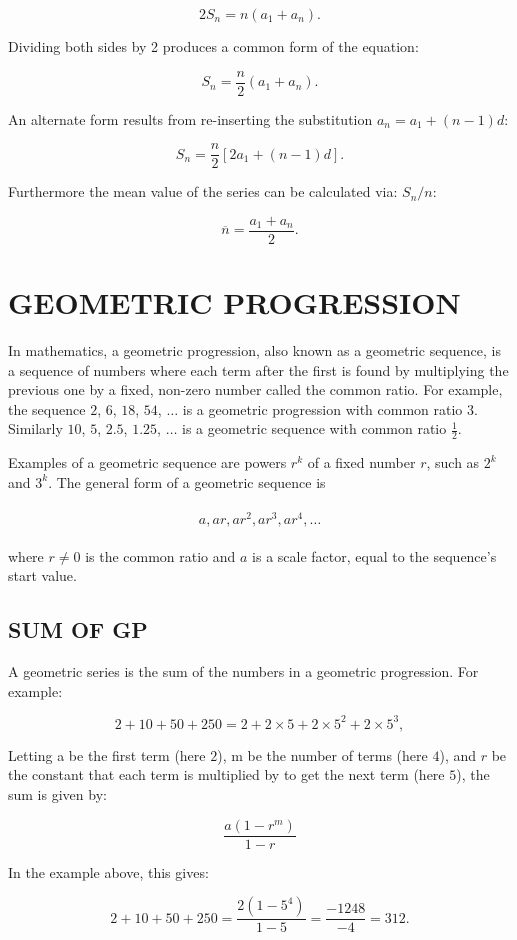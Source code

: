 \documentclass[11pt]{article}
\begin{document}
    $$2S_{n}=n(a_{1} + a_{n}).$$

Dividing both sides by 2 produces a common form of the equation:

    $$S_{n}=\frac{n}{2}( a_{1} + a_{n}).$$

An alternate form results from re-inserting the substitution $a_{n} = a_{1} + (n-1)d$:

    $$S_{n}=\frac{n}{2}[ 2a_{1} + (n-1)d].$$

Furthermore the mean value of the series can be calculated via: $S_{n} / n$:

    $$\overline{n} =\frac{a_{1} + a_{n}}{2}.$$ 
\section{GEOMETRIC PROGRESSION}
In mathematics, a geometric progression, also known as a geometric sequence, is a sequence of numbers where each term after the first is found by multiplying the previous one by a fixed, non-zero number called the common ratio. For example, the sequence $2$, $6$, $18$, $54$, $\ldots$ is a geometric progression with common ratio $3$. Similarly $10$, $5$, $2.5$, $1.25$, $\ldots$ is a geometric sequence with common ratio $\frac{1}{2}$.

Examples of a geometric sequence are powers $r^{k}$ of a fixed number $r$, such as $2^{k}$ and $3^{k}$. The general form of a geometric sequence is\\
\\
$$a,ar,ar^{2},ar^{3},ar^{4}, \ldots$$
\\
where $r \neq 0$ is the common ratio and $a$ is a scale factor, equal to the sequence's start value.
\subsection{SUM OF GP}
A geometric series is the sum of the numbers in a geometric progression. For example:

   $$2 + 10 + 50 + 250 = 2 + 2 \times 5 + 2 \times 5^{2} + 2 \times 5^{3} ,$$

Letting a be the first term (here $2$), m be the number of terms (here $4$), and $r$ be the constant that each term is multiplied by to get the next term (here $5$), the sum is given by:

$$\frac{a(1-r^{m})}{1-r}$$

In the example above, this gives:

   $$2 + 10 + 50 + 250 = \frac{2(1-5^4)}{1-5} = \frac{-1248}{-4} = 312.$$
\end{document}
